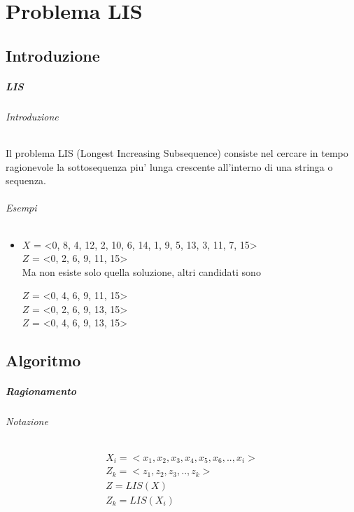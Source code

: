 \chapter{Problema LIS}

\section{Introduzione}

\paragraph{LIS}

\subparagraph{Introduzione}

Il problema LIS (Longest Increasing Subsequence) consiste nel cercare in tempo ragionevole la sottosequenza piu' lunga crescente all'interno di una stringa o sequenza.

\subparagraph{Esempi}

\begin{itemize}

\item

$X$ = <0, 8, 4, 12, 2, 10, 6, 14, 1, 9, 5, 13, 3, 11, 7, 15> \\
$Z$ = <0, 2, 6, 9, 11, 15> \\

Ma non esiste solo quella soluzione, altri candidati sono

$Z$ = <0, 4, 6, 9, 11, 15> \\
$Z$ = <0, 2, 6, 9, 13, 15> \\
$Z$ = <0, 4, 6, 9, 13, 15> \\

\end{itemize}

\section{Algoritmo}

\paragraph{Ragionamento}

\subparagraph{Notazione}

\begin{align}
    \text{$X_i = <x_1, x_2, x_3, x_4, x_5, x_6, .., x_i>$} \\
    \text{$Z_k = <z_1, z_2, z_3, .., z_k>$} \\
    \text{$Z = LIS(X)$} \\
    \text{$Z_k = LIS(X_i)$} \\
\end{align}

